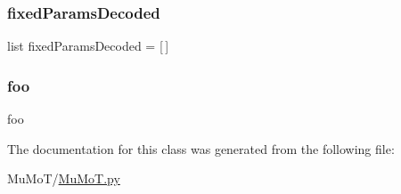 \subsubsection{\texorpdfstring{fixed\+Params\+Decoded}{fixedParamsDecoded}}
{\footnotesize\ttfamily list fixed\+Params\+Decoded = \mbox{[}$\,$\mbox{]}\hspace{0.3cm}{\ttfamily [static]}}

\mbox{\label{class_mu_mo_t_1_1_mu_mo_t_1_1_mu_mo_tcontroller_afdba98970961edb29f88241b9d99d890}} 
\subsubsection{\texorpdfstring{foo}{foo}}
{\footnotesize\ttfamily foo\hspace{0.3cm}{\ttfamily [static]}}



The documentation for this class was generated from the following file\+:\begin{DoxyCompactItemize}
\item 
Mu\+Mo\+T/\hyperlink{_mu_mo_t_8py}{Mu\+Mo\+T.\+py}\end{DoxyCompactItemize}
